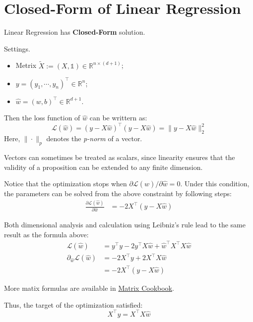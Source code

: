 \documentclass[../main]{subfiles}
\begin{document}
\section{Closed-Form of Linear Regression}
\begin{proposition}
  Linear Regression has \textbf{Closed-Form} solution.
\end{proposition}
Settings.
\begin{itemize}
  \item Metrix $\tilde X:=(X,\mathbb 1)\in \mathbb R^{n\times(d+1)}$;
  \item $y=(y_1,\cdots,y_n)^\top\in\mathbb R^n$;
  \item $\hat w=(w,b)^\top\in\mathbb R^{d+1}$.
\end{itemize}
Then the loss function of $\hat w$ can be writtern as:
\begin{equation}
    \mathcal L(\hat w)=(y-X\hat w)^\top (y-X\hat w)=\|y-X\hat w\|_2^2
\end{equation}
Here, $\|\cdot\|_p$ denotes the \emph{p-norm} of a vector.
\begin{note}
  Vectors can sometimes be treated as scalars, since linearity ensures that the validity of a proposition can be extended to any finite dimension.  
\end{note}
Notice that the optimization stops when $\partial\mathcal L(\hat w)/\partial \hat w=0$. Under this condition, the parameters can be solved from the above constraint by following steps:
\begin{align}
  \frac{\partial\mathcal L(\hat w)}{\partial\hat w}&=-2X^\top(y-X\hat w)
\end{align}
\begin{note}
  Both dimensional analysis and calculation using Leibniz's rule lead to the same result as the formula above:
  \begin{align*}
      \mathcal L(\hat w)&=y^\top y-2y^\top X\hat w+\hat w^\top X^\top X\hat w\\
      \partial_{\hat w}\mathcal L(\hat w)&=-2X^\top y+2X^\top X\hat w\\
      &=-2 X^\top(y-X\hat w)
  \end{align*}
\end{note}
\begin{remark}
  More matix formulas are available in \href{https://www.math.uwaterloo.ca/~hwolkowi/matrixcookbook.pdf}{Matrix Cookbook}.
\end{remark}
Thus, the target of the optimization satisfied:
\begin{equation}
    X^\top y=X^\top X\hat w
\end{equation}
\end{document}
